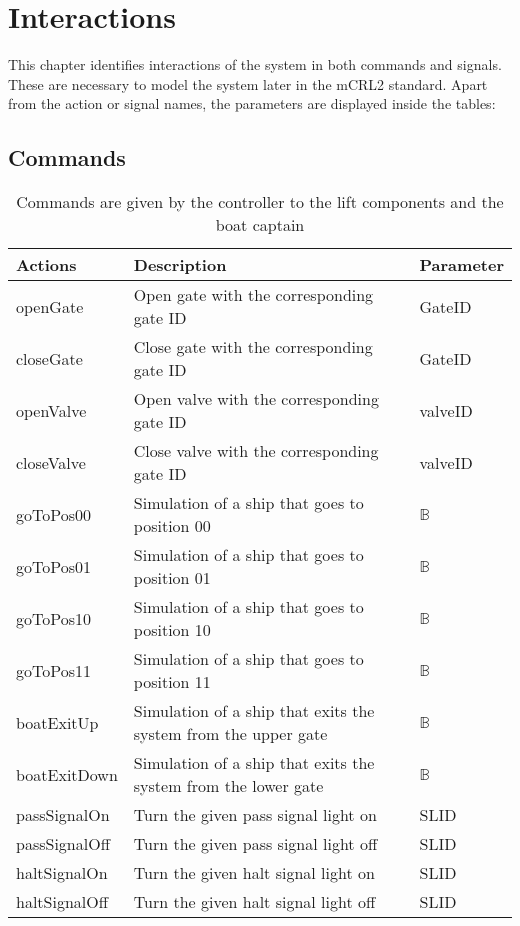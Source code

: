 \section{Interactions}
This chapter identifies interactions of the system in both commands and signals. These are necessary to model the system later in the mCRL2 standard. Apart from the action or signal names, the parameters are displayed inside the tables:

\subsection{Commands}
\begin{table}[htbp]
	\centering
	\begin{tabular}{lp{7cm}l}
		\toprule
		\textbf{Actions} & \textbf{Description} & \textbf{Parameter} \\
		\midrule
		openGate & Open gate with the corresponding gate ID & GateID \\
		closeGate & Close gate with the corresponding gate ID & GateID \\
		openValve & Open valve with the corresponding gate ID & valveID \\
		closeValve & Close valve with the corresponding gate ID & valveID \\
		goToPos00  & Simulation of a ship that goes to position 00 & $ \mathbb{B} $ \\
		goToPos01  & Simulation of a ship that goes to position 01 & $ \mathbb{B} $ \\
		goToPos10  & Simulation of a ship that goes to position 10 & $ \mathbb{B} $ \\
		goToPos11  & Simulation of a ship that goes to position 11 & $ \mathbb{B} $ \\
		boatExitUp  & Simulation of a ship that exits the system from the upper gate & $ \mathbb{B} $ \\
		boatExitDown  & Simulation of a ship that exits the system from the lower gate & $ \mathbb{B} $ \\
		passSignalOn & Turn the given pass signal light on & SLID\\
		passSignalOff & Turn the given pass signal light off & SLID\\
		haltSignalOn & Turn the given halt signal light on & SLID\\
		haltSignalOff & Turn the given halt signal light off & SLID\\
		
		\bottomrule
	\end{tabular}%

	\caption{Commands are given by the controller to the lift components and the boat captain}
		\label{tab:comd}%
\end{table}%



